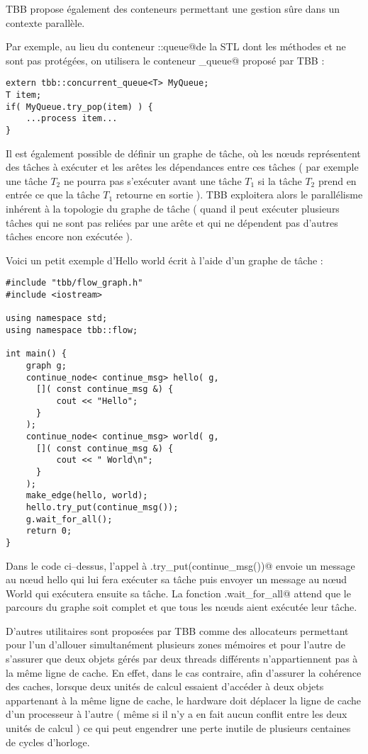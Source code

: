 \documentclass[fleqn,11pt]{article}
\begin{document}
TBB propose également des conteneurs permettant une gestion sûre dans un contexte parallèle.

Par exemple, au lieu du conteneur \lstinline@std::queue@de la STL dont les méthodes
\lstinline@push@ et \lstinline@pop@ ne sont pas protégées, on utilisera le
conteneur \lstinline@concurrent_queue@ proposé par TBB : 
\begin{lstlisting}
extern tbb::concurrent_queue<T> MyQueue;
T item;
if( MyQueue.try_pop(item) ) {
    ...process item...
}
\end{lstlisting}

Il est également possible de définir un graphe de tâche, où les n{\oe}uds représentent
des tâches à exécuter et les arêtes les dépendances entre ces tâches ( par exemple une tâche
$T_{2}$ ne pourra pas s'exécuter avant une tâche $T_{1}$ si la tâche $T_{2}$ prend en entrée
ce que la tâche $T_{1}$ retourne en sortie ). TBB exploitera alors le parallélisme
inhérent à la topologie du graphe de tâche ( quand il peut exécuter plusieurs tâches qui ne sont pas reliées
par une arête et qui ne dépendent pas d'autres tâches encore non exécutée ). 

Voici un petit exemple d'Hello  world écrit à l'aide d'un graphe de tâche :

\begin{lstlisting}
#include "tbb/flow_graph.h"
#include <iostream>

using namespace std;
using namespace tbb::flow;

int main() {
    graph g;
    continue_node< continue_msg> hello( g,
      []( const continue_msg &) {
          cout << "Hello";
      }
    );
    continue_node< continue_msg> world( g,
      []( const continue_msg &) {
          cout << " World\n";
      }
    );
    make_edge(hello, world);
    hello.try_put(continue_msg());
    g.wait_for_all();
    return 0;
}
\end{lstlisting}

Dans le code ci--dessus, l'appel à \lstinline@hello.try_put(continue_msg())@
envoie un message au n{\oe}ud hello qui lui fera exécuter sa tâche puis envoyer
un message au n{\oe}ud World qui exécutera ensuite sa tâche. La fonction
\verb@g.wait_for_all@ attend que le parcours du graphe soit complet et que tous
les n{\oe}uds aient exécutée leur tâche.

D'autres utilitaires sont proposées par TBB comme des allocateurs permettant pour l'un
d'allouer simultanément plusieurs zones mémoires et pour l'autre de s'assurer que deux objets
gérés par deux threads différents n'appartiennent pas à la même ligne de cache. En effet, dans
le cas contraire, afin d'assurer la cohérence des caches, lorsque deux unités de calcul essaient
d'accéder à deux objets appartenant à la même ligne de cache, le hardware doit déplacer la ligne
de cache d'un processeur à l'autre ( même si il n'y a en fait aucun conflit entre les deux
unités de calcul ) ce qui peut engendrer une perte inutile de plusieurs centaines de cycles
d'horloge.
\end{document}
